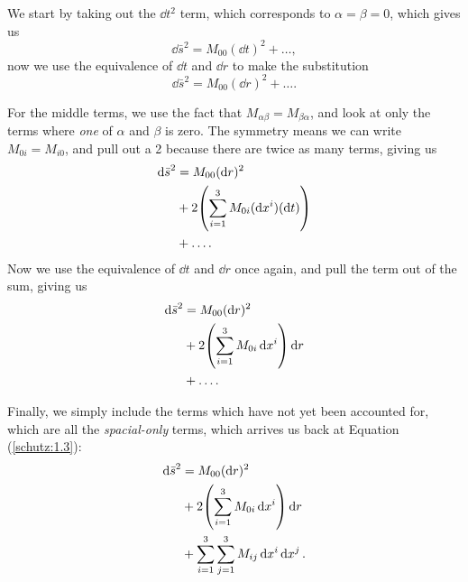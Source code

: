\documentclass[gr-notes.tex]{subfiles}
\begin{document}
We start by taking out the $\dd{t}^2$ term, which corresponds to $\alpha = \beta = 0$, which gives us
%
\begin{displaymath}
  \dd{\bar{s}}^2 = M_{00} (\dd{t})^2 + \ldots,
\end{displaymath}
%
now we use the equivalence of $\dd{t}$ and $\dd{r}$ to make the substitution
%
\begin{displaymath}
  \dd{\bar{s}}^2 = M_{00} (\dd{r})^2 + \ldots.
\end{displaymath}

For the middle terms, we use the fact that $M_{\alpha\beta} = M_{\beta\alpha}$, and look at only the terms where \emph{one} of $\alpha$ and $\beta$ is zero. The symmetry means we can write $M_{0i} = M_{i0}$, and pull out a 2 because there are twice as many terms, giving us
%
\begin{align*}
  \dd{\bar{s}}^2 &=
  M_{00} (\dd{r})^2
  \\ &+
  2 \qty( \sum_{i=1}^3 M_{0i} (\dd{x^i}) (\dd{t}) )
  \\ &+
  \ldots.
\end{align*}
%
Now we use the equivalence of $\dd{t}$ and $\dd{r}$ once again, and pull the term out of the sum, giving us
%
\begin{align*}
  \dd{\bar{s}}^2 &=
  M_{00} (\dd{r})^2
  \\ &+
  2 \qty( \sum_{i=1}^3 M_{0i} \dd{x^i} ) \dd{r}
  \\ &+
  \ldots.
\end{align*}

Finally, we simply include the terms which have not yet been accounted for, which are all the \emph{spacial-only} terms, which arrives us back at Equation (\ref{schutz:1.3}):
%
\begin{align*}
  \dd{\bar{s}}^2 &=
  M_{00} (\dd{r})^2
  \\ &+
  2 \qty( \sum_{i=1}^3 M_{0i} \dd{x^i} ) \dd{r}
  \\ &+
  \sum_{i=1}^3 \sum_{j=1}^3 M_{ij} \dd{x^i} \dd{x^j}.
\end{align*}
\end{document}
